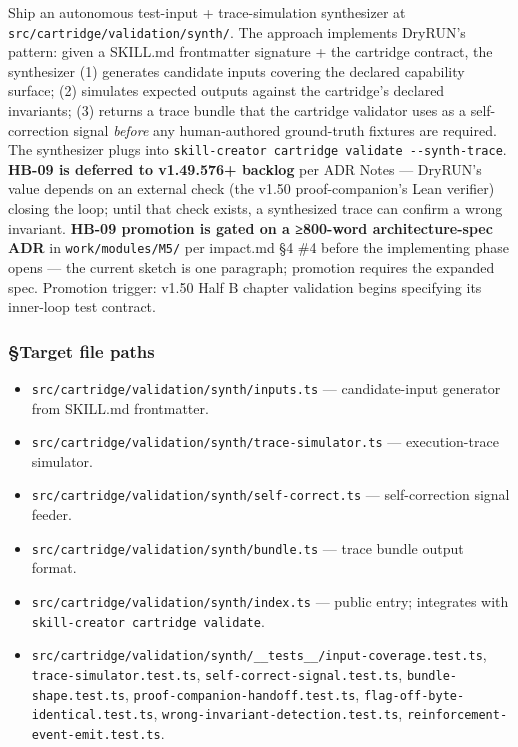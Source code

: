 \documentclass[11pt,letterpaper]{article}
\providecommand{\tightlist}{\setlength{\itemsep}{0pt}\setlength{\parskip}{0pt}}
\begin{document}
Ship an autonomous test-input + trace-simulation synthesizer at
\texttt{src/cartridge/validation/synth/}. The approach implements
DryRUN's pattern: given a SKILL.md frontmatter signature + the cartridge
contract, the synthesizer (1) generates candidate inputs covering the
declared capability surface; (2) simulates expected outputs against the
cartridge's declared invariants; (3) returns a trace bundle that the
cartridge validator uses as a self-correction signal \emph{before} any
human-authored ground-truth fixtures are required. The synthesizer plugs
into \texttt{skill-creator\ cartridge\ validate\ -\/-synth-trace}.
\textbf{HB-09 is deferred to v1.49.576+ backlog} per ADR Notes ---
DryRUN's value depends on an external check (the v1.50 proof-companion's
Lean verifier) closing the loop; until that check exists, a synthesized
trace can confirm a wrong invariant. \textbf{HB-09 promotion is gated on
a ≥800-word architecture-spec ADR} in \texttt{work/modules/M5/} per
impact.md §4 \#4 before the implementing phase opens --- the current
sketch is one paragraph; promotion requires the expanded spec. Promotion
trigger: v1.50 Half B chapter validation begins specifying its
inner-loop test contract.

\subsubsection{§Target file paths}

\begin{itemize}
\tightlist
\item
  \texttt{src/cartridge/validation/synth/inputs.ts} --- candidate-input
  generator from SKILL.md frontmatter.
\item
  \texttt{src/cartridge/validation/synth/trace-simulator.ts} ---
  execution-trace simulator.
\item
  \texttt{src/cartridge/validation/synth/self-correct.ts} ---
  self-correction signal feeder.
\item
  \texttt{src/cartridge/validation/synth/bundle.ts} --- trace bundle
  output format.
\item
  \texttt{src/cartridge/validation/synth/index.ts} --- public entry;
  integrates with \texttt{skill-creator\ cartridge\ validate}.
\item
  \texttt{src/cartridge/validation/synth/\_\_tests\_\_/input-coverage.test.ts},
  \texttt{trace-simulator.test.ts},
  \texttt{self-correct-signal.test.ts}, \texttt{bundle-shape.test.ts},
  \texttt{proof-companion-handoff.test.ts},
  \texttt{flag-off-byte-identical.test.ts},
  \texttt{wrong-invariant-detection.test.ts},
  \texttt{reinforcement-event-emit.test.ts}.
\end{itemize}
\end{document}
